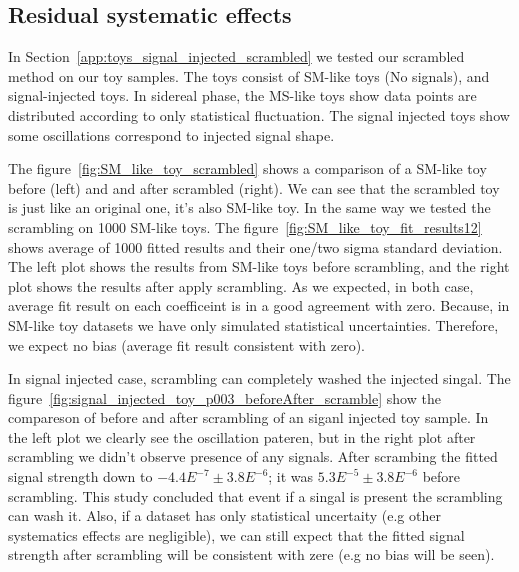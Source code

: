 \subsection{Residual systematic effects} %
\label{lab:Syst_ResidualEffecte}

In Section~\ref{app:toys_signal_injected_scrambled} we tested our scrambled method on
our toy samples. The toys consist of SM-like toys (No signals), and 
signal-injected toys. In sidereal phase, the MS-like toys show data points
are distributed according to only statistical fluctuation. The signal injected toys show 
some oscillations correspond to injected signal shape.

The figure~\ref{fig:SM_like_toy_scrambled} shows a comparison of a SM-like toy before (left) and
and after scrambled (right). We can see that the scrambled toy is just like an original one,
it's also SM-like toy. In the same way we tested the scrambling on 1000 SM-like toys. 
The figure~\ref{fig:SM_like_toy_fit_results12} shows average of 1000 fitted results and their one/two 
sigma standard deviation. The left plot shows the results from SM-like toys before scrambling,
and the right plot shows the results after apply scrambling.
As we expected, in both case, average fit result on each coefficeint is in a good 
agreement with zero. Because, in SM-like toy datasets we have only 
simulated statistical uncertainties. Therefore, we expect no bias 
(average fit result consistent with zero).

In signal injected case, scrambling can completely washed the injected singal. 
The figure~\ref{fig:signal_injected_toy_p003_beforeAfter_scramble} show the compareson 
of before and after scrambling of an siganl injected toy sample. In the left plot we clearly 
see the oscillation pateren, but in the right plot after scrambling we didn't observe presence 
of any signals. After scrambing the fitted signal strength down to $-4.4E^{-7}\pm 3.8E^{-6}$;
 it was $5.3E^{-5}\pm 3.8E^{-6}$ before scrambling. This study concluded that event 
 if a singal is present the scrambling can wash it.
Also, if a dataset has only statistical uncertaity (e.g other systematics effects are negligible),
we can still expect that the fitted signal strength after scrambling will be 
consistent with zere (e.g no bias will be seen).



